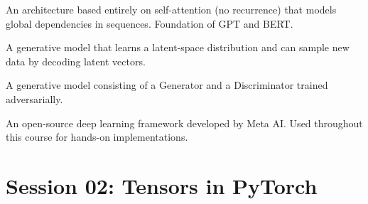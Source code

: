 \documentclass[12pt,a4paper]{article}
\begin{document}
\begin{description}[style=nextline]
  \item[Transformer]
    An architecture based entirely on self-attention (no recurrence) that
    models global dependencies in sequences.  Foundation of GPT and BERT.

  \item[Variational Autoencoder (VAE)]
    A generative model that learns a latent-space distribution and can
    sample new data by decoding latent vectors.

  \item[Generative Adversarial Network (GAN)]
    A generative model consisting of a Generator and a Discriminator
    trained adversarially.

  \item[PyTorch]
    An open-source deep learning framework developed by Meta AI.  Used
    throughout this course for hands-on implementations.
\end{description}

\clearpage

\part{Session 02: Tensors in PyTorch}

\end{document}
